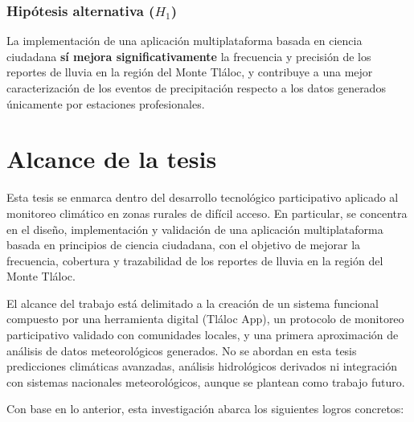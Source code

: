 \subsubsection{Hipótesis alternativa ($H_1$)}
La implementación de una aplicación multiplataforma basada en ciencia ciudadana \textbf{sí mejora significativamente} la frecuencia y precisión de los reportes de lluvia en la región del Monte Tláloc, y contribuye a una mejor caracterización de los eventos de precipitación respecto a los datos generados únicamente por estaciones profesionales.

\section{Alcance de la tesis}

Esta tesis se enmarca dentro del desarrollo tecnológico participativo aplicado al monitoreo climático en zonas rurales de difícil acceso. En particular, se concentra en el diseño, implementación y validación de una aplicación multiplataforma basada en principios de ciencia ciudadana, con el objetivo de mejorar la frecuencia, cobertura y trazabilidad de los reportes de lluvia en la región del Monte Tláloc.

El alcance del trabajo está delimitado a la creación de un sistema funcional compuesto por una herramienta digital (Tláloc App), un protocolo de monitoreo participativo validado con comunidades locales, y una primera aproximación de análisis de datos meteorológicos generados. No se abordan en esta tesis predicciones climáticas avanzadas, análisis hidrológicos derivados ni integración con sistemas nacionales meteorológicos, aunque se plantean como trabajo futuro.

Con base en lo anterior, esta investigación abarca los siguientes logros concretos:

